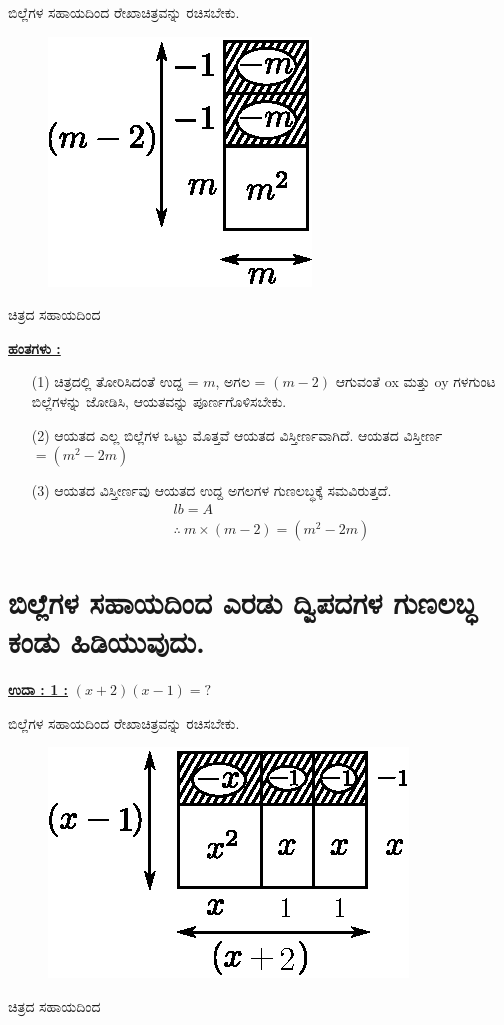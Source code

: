 ಬಿಲ್ಲೆಗಳ ಸಹಾಯದಿಂದ ರೇಖಾಚಿತ್ರವನ್ನು ರಚಿಸಬೇಕು.
\begin{figure}[H]
\centering
\includegraphics[scale=0.8]{src/figure/chap3/fig3-30b.eps}
\end{figure}
ಚಿತ್ರದ ಸಹಾಯದಿಂದ

\noindent
{\textbf{\underline{ಹಂತಗಳು :}}} 
\begin{itemize}
\item [(1)] ಚಿತ್ರದಲ್ಲಿ ತೋರಿಸಿದಂತೆ ಉದ್ದ = $m$, ಅಗಲ = $(m - 2)$ ಆಗುವಂತೆ ox ಮತ್ತು oy ಗಳಗುಂಟ ಬಿಲ್ಲೆಗಳನ್ನು ಜೋಡಿಸಿ, ಆಯತವನ್ನು ಪೂರ್ಣಗೊಳಿಸಬೇಕು.
\item [(2)] ಆಯತದ ಎಲ್ಲ ಬಿಲ್ಲೆಗಳ ಒಟ್ಟು ಮೊತ್ತವೆ ಆಯತದ ವಿಸ್ತೀರ್ಣವಾಗಿದೆ. ಆಯತದ ವಿಸ್ತೀರ್ಣ $= (m^2 - 2m)$
\item [(3)] ಆಯತದ ವಿಸ್ತೀರ್ಣವು ಆಯತದ ಉದ್ದ ಅಗಲಗಳ ಗುಣಲಬ್ಧಕ್ಕೆ ಸಮವಿರುತ್ತದೆ.
\begin{gather*}
lb = A\\
\therefore~ m \times (m - 2) = (m^2 - 2m)
\end{gather*}

\end{itemize}

\section*{ಬಿಲ್ಲೆಗಳ ಸಹಾಯದಿಂದ ಎರಡು ದ್ವಿಪದಗಳ ಗುಣಲಬ್ಧ ಕಂಡು ಹಿಡಿಯುವುದು.}

\noindent
{\textbf{\underline{ಉದಾ : 1 :}}} $(x + 2)(x - 1) = ?$

ಬಿಲ್ಲೆಗಳ ಸಹಾಯದಿಂದ ರೇಖಾಚಿತ್ರವನ್ನು ರಚಿಸಬೇಕು.
\begin{figure}[H]
\centering
\includegraphics[scale=0.8]{src/figure/chap3/fig3-31a.eps}
\end{figure}
ಚಿತ್ರದ ಸಹಾಯದಿಂದ

